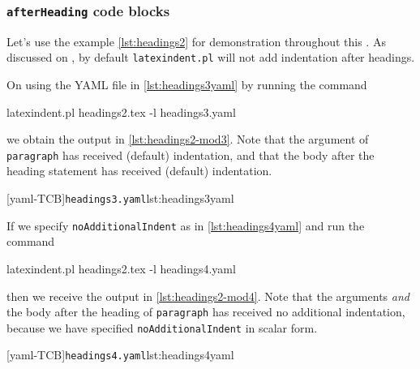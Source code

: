 \subsubsection{\texttt{afterHeading} code blocks}\label{subsubsec-headings-no-add-indent-rules}
	Let's use the example \cref{lst:headings2} for demonstration throughout this .
	As discussed on , by default \texttt{latexindent.pl} will not add indentation after headings.


	On using the YAML file in \cref{lst:headings3yaml} by running the command
	\begin{commandshell}
latexindent.pl headings2.tex -l headings3.yaml      
    \end{commandshell}
	we obtain the output in \cref{lst:headings2-mod3}. Note that the argument of \texttt{paragraph} has received (default) indentation,
	and that the body after the heading statement has received (default) indentation.

	\begin{minipage}{.45\textwidth}
	\end{minipage}%
	\hfill
	\begin{minipage}{.45\textwidth}
		[yaml-TCB]{\texttt{headings3.yaml}}{lst:headings3yaml}
	\end{minipage}

	If we specify \texttt{noAdditionalIndent} as in \cref{lst:headings4yaml} and run the command
	\begin{commandshell}
latexindent.pl headings2.tex -l headings4.yaml      
    \end{commandshell}
	then we receive the output in \cref{lst:headings2-mod4}. Note that the arguments \emph{and} the body after the heading
	of \texttt{paragraph} has received no additional indentation, because we have specified \texttt{noAdditionalIndent} in scalar form.

	\begin{minipage}{.45\textwidth}
	\end{minipage}%
	\hfill
	\begin{minipage}{.45\textwidth}
		[yaml-TCB]{\texttt{headings4.yaml}}{lst:headings4yaml}
	\end{minipage}


